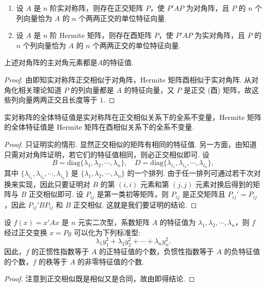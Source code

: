 \documentclass[../../main.tex]{subfiles}%
\begin{document}
\begin{theorem}\label{theorem:实对称和Hermite矩阵的正交对角化}
\begin{enumerate}
\item 设 $A$ 是 $n$ 阶实对称阵，则存在正交矩阵 $P$，使 $P'AP$ 为对角阵，且 $P$ 的 $n$ 个列向量恰为 $A$ 的 $n$ 个两两正交的单位特征向量.

\item 设 $A$ 是 $n$ 阶 Hermite 矩阵，则存在酉矩阵 $P$，使 $\overline{P}'AP$ 为实对角阵，且 $P$ 的 $n$ 个列向量恰为 $A$ 的 $n$ 个两两正交的单位特征向量.
\end{enumerate}
\end{theorem}
\begin{remark}
上述对角阵的主对角元素都是$A$的特征值.
\end{remark}
\begin{proof}

由即知实对称阵正交相似于对角阵，Hermite 矩阵酉相似于实对角阵. 从对角化相关理论知道 $P$ 的列向量都是 $A$ 的特征向量，又 $P$ 是正交 (酉) 矩阵，故这些列向量两两正交且长度等于 $1$. 

\end{proof}

\begin{corollary}\label{corollary:实对称和Hermite矩阵的全系不变量}
实对称阵的全体特征值是实对称阵在正交相似关系下的全系不变量，Hermite 矩阵的全体特征值是 Hermite 矩阵在酉相似关系下的全系不变量.
\end{corollary}
\begin{proof}

只证明实的情形. 显然正交相似的矩阵有相同的特征值. 另一方面，由知道只需对对角阵证明，若它们的特征值相同，则必正交相似即可. 设
\[
B = \mathrm{diag}\{\lambda_1,\lambda_2,\cdots,\lambda_n\}, \quad D = \mathrm{diag}\{\lambda_{i_1},\lambda_{i_2},\cdots,\lambda_{i_n}\},
\]
其中 $\{\lambda_{i_1},\lambda_{i_2},\cdots,\lambda_{i_n}\}$ 是 $\{\lambda_1,\lambda_2,\cdots,\lambda_n\}$ 的一个排列. 由于任一排列可通过若干次对换来实现，因此只要证明对 $B$ 的第 $(i,i)$ 元素和第 $(j,j)$ 元素对换后得到的矩阵与 $B$ 正交相似即可. 设 $P_{ij}$ 是第一类初等矩阵，则 $P_{ij}$ 是正交矩阵且 $P_{ij}' = P_{ij}$，因此 $P_{ij}'BP_{ij}$ 和 $B$ 正交相似. 这就是我们要证明的结论.

\end{proof}

\begin{theorem}\label{theorem:二次型经正交变换后可化为标准型}
设 $f(x) = x'Ax$ 是 $n$ 元实二次型，系数矩阵 $A$ 的特征值为 $\lambda_1,\lambda_2,\cdots,\lambda_n$，则 $f$ 经过正交变换 $x = Py$ 可以化为下列标准型:
\[
\lambda_1y_1^2 + \lambda_2y_2^2 + \cdots + \lambda_ny_n^2.
\]
因此，$f$ 的正惯性指数等于 $A$ 的正特征值的个数，负惯性指数等于 $A$ 的负特征值的个数，$f$ 的秩等于 $A$ 的非零特征值的个数.
\end{theorem}
\begin{proof}

注意到正交相似既是相似又是合同，故由即得结论. 

\end{proof}
\end{document}
